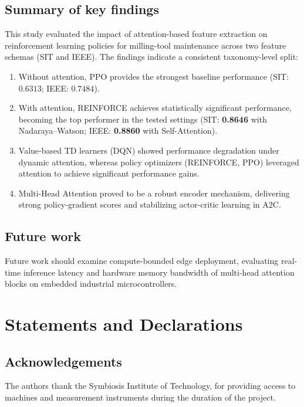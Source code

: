 \documentclass[sn-basic]{sn-jnl}%
\begin{document}
\subsection{Summary of key findings}
This study evaluated the impact of attention-based feature extraction on reinforcement learning policies for milling-tool maintenance across two feature schemas (SIT and IEEE). The findings indicate a consistent taxonomy-level split:
\begin{enumerate}
    \item Without attention, \textsc{PPO} provides the strongest baseline performance (SIT: $0.6313$; IEEE: $0.7484$).
	\item With attention, \textsc{REINFORCE} achieves statistically significant performance, becoming the top performer in the tested settings (SIT: \textbf{0.8646} with Nadaraya--Watson; IEEE: \textbf{0.8860} with Self-Attention).
    \item Value-based TD learners (\textsc{DQN}) showed performance degradation under dynamic attention, whereas policy optimizers (\textsc{REINFORCE}, \textsc{PPO}) leveraged attention to achieve significant performance gains.
	\item Multi-Head Attention proved to be a robust encoder mechanism, delivering strong policy-gradient scores and stabilizing actor-critic learning in \textsc{A2C}.
\end{enumerate}

\subsection{Future work}
Future work should examine compute-bounded edge deployment, evaluating real-time inference latency and hardware memory bandwidth of multi-head attention blocks on embedded industrial microcontrollers.


\section*{Statements and Declarations}

\subsection*{Acknowledgements}
The authors thank the Symbiosis Institute of Technology, for providing access to machines and measurement instruments during the duration of the project.
\end{document}
